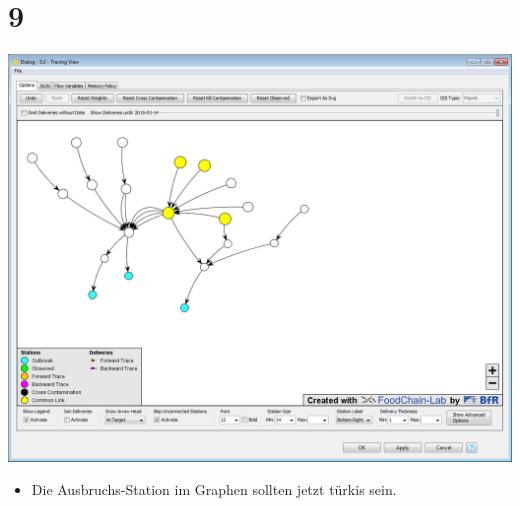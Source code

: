 \documentclass{beamer}
\begin{document}
\section{9}
\begin{frame}
	\begin{center}
  		\includegraphics[height=0.6\textheight]{9.png}
	\end{center}
	\begin{itemize}
		\item Die Ausbruchs-Station im Graphen sollten jetzt türkis sein.
	\end{itemize}
\end{frame}
\end{document}
